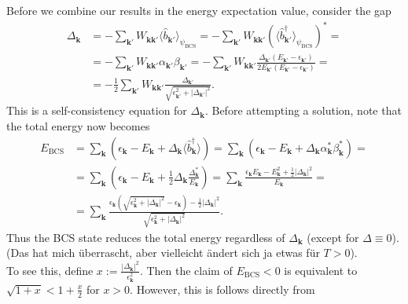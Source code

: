 \documentclass[english, parskip=full]{scrartcl}
\renewcommand{\bra}{}
\newcommand{\kla}{}
\newcommand{\tecxt}{}
\begin{document}
Before we combine our results in the energy expectation value, consider the gap
\begin{align}
\Delta_\textbf{k} &= -\sum_{\textbf{k}'} W_{\textbf{k}\textbf{k}'} \bra\langle \hat{b}_{\textbf{k}'} \rangle_{\psi_\tecxt\text{BCS}} = -\sum_{\textbf{k}'} W_{\textbf{k}\textbf{k}'} \kla\left( \bra\langle \hat{b}_{\textbf{k}'}^\dagger \rangle_{\psi_\tecxt\text{BCS}} \right)^\ast = \\
&= -\sum_{\textbf{k}'} W_{\textbf{k}\textbf{k}'} \alpha_{\textbf{k}'} \beta_{\textbf{k}'} = -\sum_{\mathbf{k}'} W_{\mathbf{k}\textbf{k}'} \frac{\Delta_{\mathbf{k}'} \kla\left( E_{\mathbf{k}'} - \epsilon_{\mathbf{k}'} \right)}{2E_{\mathbf{k}'} (E_{\mathbf{k}'} - \epsilon_{\mathbf{k}'})} = \\
&= -\frac{1}{2}\sum_{\mathbf{k}'} W_{\mathbf{k}\textbf{k}'} \frac{\Delta_{\mathbf{k}'}}{\sqrt{\epsilon_{\mathbf{k}'}^2 + |\Delta_{\mathbf{k}'}|^2}}.
\end{align}
This is a self-consistency equation for $\Delta_\textbf{k}$.
Before attempting a solution, note that the total energy now becomes
\begin{align}
E_\tecxt\text{BCS} &= \sum_\textbf{k} \kla\left( \epsilon_\textbf{k} - E_\textbf{k} + \Delta_\textbf{k} \langle \hat{b}_{\mathbf{k}}^\dagger \rangle \right) = \sum_\textbf{k} \kla\left( \epsilon_\textbf{k} - E_\textbf{k} + \Delta_\textbf{k} \alpha_\textbf{k}^\ast \beta_\textbf{k}^\ast \right) = \\
&= \sum_\textbf{k} \kla\left( \epsilon_\textbf{k} - E_\textbf{k} + \frac{1}{2} \Delta_\textbf{k} \frac{\Delta_\textbf{k}^\ast}{E_\textbf{k}} \right) = \sum_\textbf{k} \frac{\epsilon_\textbf{k} E_\textbf{k} - E_\textbf{k}^2 + \frac{1}{2} |\Delta_\textbf{k}|^2}{E_\textbf{k}} = \\
&= \sum_\textbf{k} \frac{\epsilon_\textbf{k}\kla\left( \sqrt{\epsilon_\textbf{k}^2 + |\Delta_\textbf{k}|^2} - \epsilon_\textbf{k} \right) - \frac{1}{2}|\Delta_\textbf{k}|^2}{\sqrt{\epsilon_\textbf{k}^2 + |\Delta_\textbf{k}|^2}}.
\end{align}
Thus the BCS state reduces the total energy regardless of $\Delta_\textbf{k}$ (except for $\Delta\equiv 0$).
\\(Das hat mich überrascht, aber vielleicht ändert sich ja etwas für $T>0$).\\
To see this, define $x := \frac{|\Delta_\textbf{k}|^2}{\epsilon_\textbf{k}^2}$.
Then the claim of $E_\tecxt\text{BCS} < 0$ is equivalent to $\sqrt{1 + x} < 1+\frac{x}{2}$ for $x>0$.
However, this is follows directly from
\end{document}
